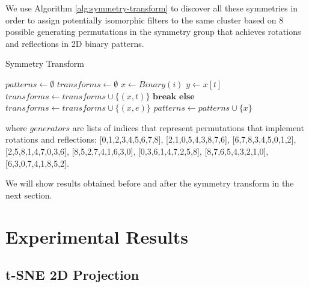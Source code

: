 \documentclass{article} %
\begin{document}
We use Algorithm \ref{alg:symmetry-transform} to discover all these symmetries in order to assign potentially isomorphic filters to the same cluster based on 8 possible generating permutations in the symmetry group that achieves rotations and reflections in 2D binary patterns.


\begin{algorithm}[ht]
\caption{Symmetry Transform}
\label{alg:symmetry-transform}
\begin{algorithmic}
		\State $patterns \gets \emptyset$
		\State $transforms \gets \emptyset$
			\State $x \gets Binary(i)$ 
				\State $y \gets x[t]$
					\State $transforms \gets transforms \cup \{ (x,t) \}$
					\State $\textbf{break}$
				\EndIf
			\EndFor
			\State $\textbf{else}$
			\Indent
				\State $transforms \gets transforms \cup \{ (x,e) \}$ 
				\State $patterns \gets patterns \cup \{ x \}$ 
			\EndIndent
		\EndFor
\EndProcedure
\end{algorithmic}
\end{algorithm}

where $generators$ are lists of indices that represent permutations that implement rotations and reflections: [0,1,2,3,4,5,6,7,8],
    [2,1,0,5,4,3,8,7,6],
    [6,7,8,3,4,5,0,1,2],
    [2,5,8,1,4,7,0,3,6],
    [8,5,2,7,4,1,6,3,0],
    [0,3,6,1,4,7,2,5,8],
    [8,7,6,5,4,3,2,1,0],
    [6,3,0,7,4,1,8,5,2].

We will show results obtained before and after the symmetry transform in the next section.

\section{Experimental Results}

\subsection{t-SNE 2D Projection}
\end{document}
